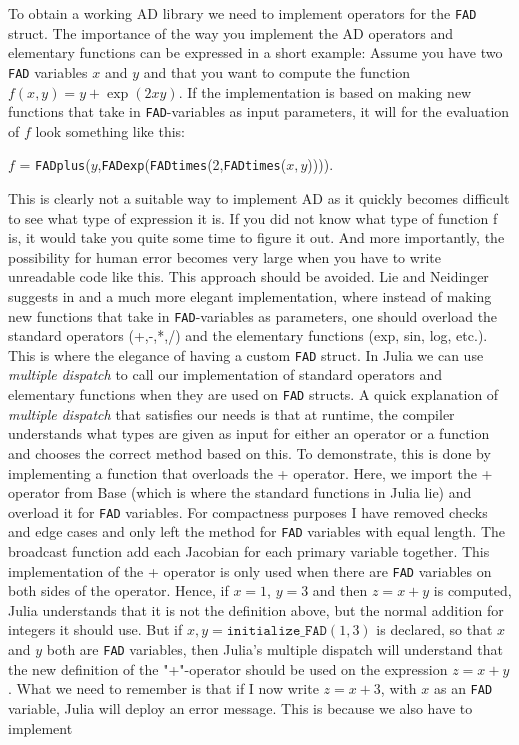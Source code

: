 To obtain a working AD library we need to implement operators for the \texttt{FAD} struct. The importance of the way you implement the AD operators and elementary functions can be expressed in a short example: Assume you have two \texttt{FAD} variables $x$ and $y$ and that you want to compute the function $f(x,y) = y+\exp(2xy)$. If the implementation is based on making new functions that take in \texttt{FAD}-variables as input parameters, it will for the evaluation of $f$ look something like this: 
\begin{center}
    $f$ = \texttt{FADplus}($y$,\texttt{FADexp}(\texttt{FADtimes}(2,\texttt{FADtimes}($x,y$)))).
\end{center}
This is clearly not a suitable way to implement AD as it quickly becomes difficult to see what type of expression it is. If you did not know what type of function f is, it would take you quite some time to figure it out. And more importantly, the possibility for human error becomes very large when you have to write unreadable code like this. This approach should be avoided. Lie and Neidinger suggests in \emph{\cite{lieMrstUrl}} and \emph{\cite{doi:10.1137/080743627}} a much more elegant implementation, where instead of making new functions that take in \texttt{FAD}-variables as parameters, one should overload the standard operators (+,-,*,/) and the elementary functions (exp, sin, log, etc.). This is where the elegance of having a custom \texttt{FAD} struct. In Julia we can use \emph{multiple dispatch} to call our implementation of standard operators and elementary functions when they are used on \texttt{FAD} structs. A quick explanation of \emph{multiple dispatch} that satisfies our needs is that at runtime, the compiler understands what types are given as input for either an operator or a function and chooses the correct method based on this. To demonstrate, this is done by implementing a function  
that overloads the + operator. Here, we import the + operator from Base (which is where the standard functions in Julia lie) and overload it for \texttt{FAD} variables. For compactness purposes I have removed checks and edge cases and only left the method for \texttt{FAD} variables with equal length. The broadcast function add each Jacobian for each primary variable together. This implementation of the + operator is only used when there are \texttt{FAD} variables on both sides of the operator. Hence, if $x = 1$, $y = 3$ and then $z = x+y$ is computed, Julia understands that it is not the definition above, but the normal addition for integers it should use. But if $x,y = \texttt{initialize\_FAD}(1,3)$ is declared, so that $x$ and $y$ both are \texttt{FAD} variables, then Julia's multiple dispatch will understand that the new definition of the "+"-operator should be used on the expression $z = x+y$. What we need to remember is that if I now write $z = x + 3$, with $x$ as an \texttt{FAD} variable, Julia will deploy an error message. This is because we also have to implement
